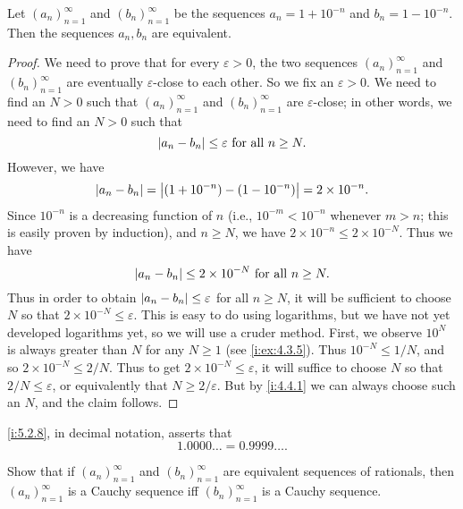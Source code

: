 \begin{prop}\label{i:5.2.8}
  Let \((a_n)_{n = 1}^{\infty}\) and \((b_n)_{n = 1}^{\infty}\) be the sequences \(a_n = 1 + 10^{-n}\) and \(b_n = 1 - 10^{-n}\).
  Then the sequences \(a_n, b_n\) are equivalent.
\end{prop}

\begin{proof}
  We need to prove that for every \(\varepsilon > 0\), the two sequences \((a_n)_{n = 1}^{\infty}\) and \((b_n)_{n = 1}^{\infty}\) are eventually \(\varepsilon\)-close to each other.
  So we fix an \(\varepsilon > 0\).
  We need to find an \(N > 0\) such that \((a_n)_{n = 1}^{\infty}\) and \((b_n)_{n = 1}^{\infty}\) are \(\varepsilon\)-close;
  in other words, we need to find an \(N > 0\) such that
  \[
    \left\lvert a_n - b_n\right\rvert \leq \varepsilon \text{ for all } n \geq N.
  \]
  However, we have
  \[
    \left\lvert a_n - b_n\right\rvert = \left\lvert(1 + 10^{-n}) - (1 - 10^{-n})\right\rvert = 2 \times 10^{-n}.
  \]
  Since \(10^{-n}\) is a decreasing function of \(n\) (i.e., \(10^{-m} < 10^{-n}\) whenever \(m > n\);
  this is easily proven by induction), and \(n \geq N\), we have \(2 \times 10^{-n} \leq 2 \times 10^{-N}\).
  Thus we have
  \[
    \left\lvert a_n - b_n\right\rvert \leq 2 \times 10^{-N} \text{ for all } n \geq N.
  \]
  Thus in order to obtain \(\left\lvert a_n - b_n\right\rvert \leq \varepsilon\) for all \(n \geq N\), it will be sufficient to choose \(N\) so that \(2 \times 10^{-N} \leq \varepsilon\).
  This is easy to do using logarithms, but we have not yet developed logarithms yet, so we will use a cruder method.
  First, we observe \(10^N\) is always greater than \(N\) for any \(N \geq 1\) (see \cref{i:ex:4.3.5}).
  Thus \(10^{-N} \leq 1 / N\), and so \(2 \times 10^{-N} \leq 2 / N\).
  Thus to get \(2 \times 10^{-N} \leq \varepsilon\), it will suffice to choose \(N\) so that \(2 / N \leq \varepsilon\), or equivalently that \(N \geq 2 / \varepsilon\).
  But by \cref{i:4.4.1} we can always choose such an \(N\), and the claim follows.
\end{proof}

\begin{rmk}\label{i:5.2.9}
  \cref{i:5.2.8}, in decimal notation, asserts that
  \[
    1.0000 \dots = 0.9999 \dots.
  \]
\end{rmk}

\exercisesection

\begin{ex}\label{i:ex:5.2.1}
  Show that if \((a_n)_{n = 1}^{\infty}\) and \((b_n)_{n = 1}^{\infty}\) are equivalent sequences of rationals, then \((a_n)_{n = 1}^{\infty}\) is a Cauchy sequence iff \((b_n)_{n = 1}^{\infty}\) is a Cauchy sequence.
\end{ex}

